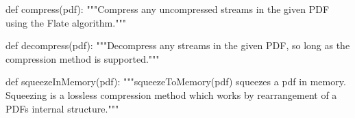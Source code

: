 def compress(pdf):
    """Compress any uncompressed streams in the given PDF using the Flate
    algorithm."""

def decompress(pdf):
    """Decompress any streams in the given PDF, so long as the compression
    method is supported."""

def squeezeInMemory(pdf):
    """squeezeToMemory(pdf) squeezes a pdf in memory. Squeezing is a lossless
    compression method which works by rearrangement of a PDFs internal
    structure."""
